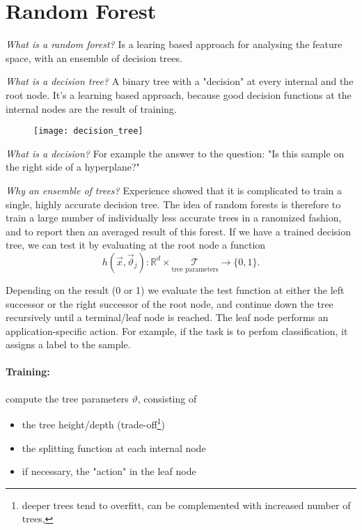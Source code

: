 
\section*{Random Forest}

\textit{What is a random forest?} Is a learing based approach for analysing the feature space, with an ensemble of decision trees.

\textit{What is a decision tree?} A binary tree with a "decision" at every internal and the root node. It's a learning based approach, because good decision functions at the internal nodes are the result of training.

\begin{figure}[H]
  \centering
  \texttt{[image: decision\_tree]}
\end{figure}


\textit{What is a decision?} For example the answer to the question: "Is this sample on the right side of a hyperplane?"

\textit{Why an ensemble of trees?} Experience showed that it is complicated to train a single, highly accurate decision tree. The idea of random forests is therefore to train a large number of individually less accurate trees in a ranomized fashion, and to report then an averaged result of this forest.
If we have a trained decision tree, we can test it by evaluating at the root node a function
\[h(\vec{x}, \vec{\vartheta}_j): \mathbb{R}^d \times \underset{\text{tree parameters}}{\mathcal{T}} \rightarrow \{0, 1\}.\]

Depending on the result (0 or 1) we evaluate the test function at either the left successor or the right successor of the root node, and continue down the tree recursively until a terminal/leaf node is reached.
The leaf node performs an application-specific action. For example, if the task is to perfom classification, it assigns a label to the sample.

\paragraph{Training:} compute the tree parameters \(\vartheta\), consisting of
\begin{itemize}
    \item the tree height/depth (trade-off\footnote{deeper trees tend to overfitt, can be complemented with increased number of trees,})
    \item the splitting function at each internal node
    \item if necessary, the "action" in the leaf node
\end{itemize}

